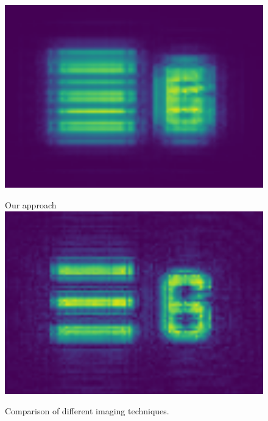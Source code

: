 \documentclass{article}
\begin{document}
\begin{figure}[hbt!]
\begin{minipage}{.225\linewidth}
\includegraphics[width=\linewidth]{003 confocal imaging.png}
\label{subfig:confocal}
\end{minipage}\hfill
\begin{minipage}{.225\linewidth}
\centering
\captionsetup{type=figure}
Our approach \
\includegraphics[width=\linewidth]{004 ism imaging.png}
\label{subfig:ism}
\end{minipage}
\caption{Comparison of different imaging techniques.}
\label{fig:roc}
\end{figure}


\printbibliography
\end{document}
